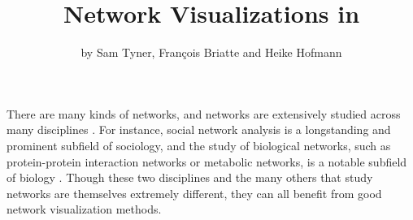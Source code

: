 \title{Network Visualizations in }
\author{by Sam Tyner, Fran\c{c}ois Briatte and  Heike Hofmann}

\maketitle
{}

% 
% 
% 
% 
% 







\par There are many kinds of networks, and networks are extensively studied across many disciplines \citep{watts2004ars}. For instance, social network analysis is a longstanding and prominent subfield of sociology, and the study of biological networks, such as protein-protein interaction networks or metabolic networks, is a notable subfield of biology \citep{prell2011social, junker2008analysis}. Though these two disciplines and the many others that study networks are themselves extremely different, they can all benefit from good network visualization methods.

